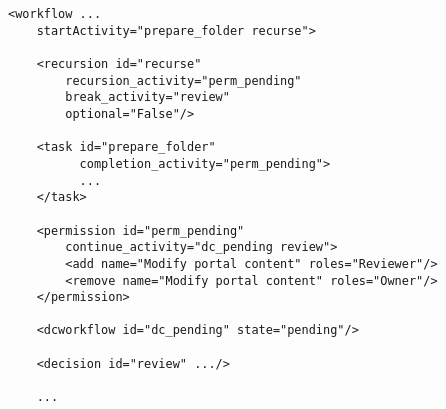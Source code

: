 \begin{verbatim}
<workflow ...
    startActivity="prepare_folder recurse">
    
    <recursion id="recurse"
        recursion_activity="perm_pending"
        break_activity="review"
        optional="False"/>
        
    <task id="prepare_folder"
          completion_activity="perm_pending">
          ...
    </task>

    <permission id="perm_pending"
        continue_activity="dc_pending review">
        <add name="Modify portal content" roles="Reviewer"/>
        <remove name="Modify portal content" roles="Owner"/>
    </permission>

    <dcworkflow id="dc_pending" state="pending"/>
    
    <decision id="review" .../>

    ...
\end{verbatim}

